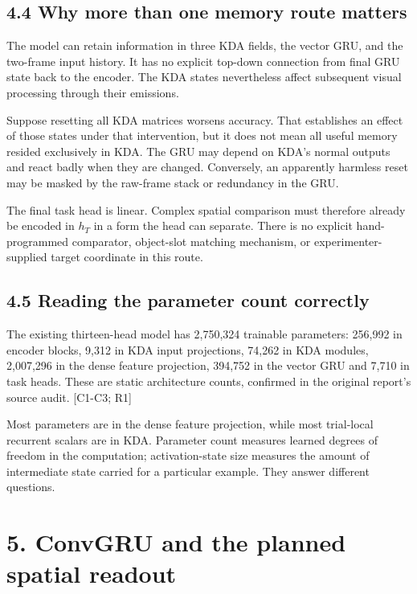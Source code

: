 \documentclass[
  11pt,
]{article}
\let\oldsubsection\subsection
\renewcommand{\subsection}{\Needspace{6\baselineskip}\oldsubsection}
\begin{document}
\subsection{4.4 Why more than one memory route
matters}\label{why-more-than-one-memory-route-matters}

The model can retain information in three KDA fields, the vector GRU,
and the two-frame input history. It has no explicit top-down connection
from final GRU state back to the encoder. The KDA states nevertheless
affect subsequent visual processing through their emissions.

Suppose resetting all KDA matrices worsens accuracy. That establishes an
effect of those states under that intervention, but it does not mean all
useful memory resided exclusively in KDA. The GRU may depend on KDA's
normal outputs and react badly when they are changed. Conversely, an
apparently harmless reset may be masked by the raw-frame stack or
redundancy in the GRU.

The final task head is linear. Complex spatial comparison must therefore
already be encoded in \(h_T\) in a form the head can separate. There is
no explicit hand-programmed comparator, object-slot matching mechanism,
or experimenter-supplied target coordinate in this route.

\subsection{4.5 Reading the parameter count
correctly}\label{reading-the-parameter-count-correctly}

The existing thirteen-head model has 2,750,324 trainable parameters:
256,992 in encoder blocks, 9,312 in KDA input projections, 74,262 in KDA
modules, 2,007,296 in the dense feature projection, 394,752 in the
vector GRU and 7,710 in task heads. These are static architecture
counts, confirmed in the original report's source audit. {[}C1-C3; R1{]}

Most parameters are in the dense feature projection, while most
trial-local recurrent scalars are in KDA. Parameter count measures
learned degrees of freedom in the computation; activation-state size
measures the amount of intermediate state carried for a particular
example. They answer different questions.

\newpage

\section{5. ConvGRU and the planned spatial
readout}\label{convgru-and-the-planned-spatial-readout}
\end{document}
